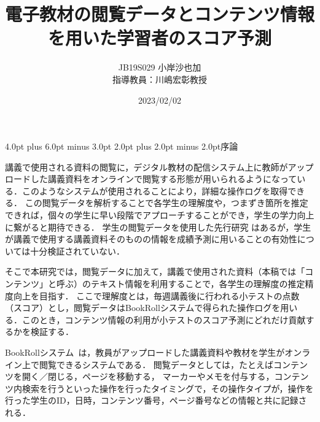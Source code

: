 \documentclass[a4paper,twocolumn,11pt]{jarticle}
\title{電子教材の閲覧データとコンテンツ情報を用いた学習者のスコア予測}
\author{JB19S029 小岸沙也加　
\\ 指導教員：川嶋宏彰教授}
\date{2023/02/02}
\makeatletter
\renewcommand{\section}{\@startsection {section}{1}{\z@}%
{4.0pt plus 6.0pt minus 3.0pt}%
{2.0pt plus 2.0pt minus 2.0pt}{\large\bf }}
\makeatother
\begin{document}
\maketitle
\newtheorem{thm}{定理}
\newtheorem{df}[thm]{定義}
\newtheorem{lm}[thm]{補題}
\newtheorem{co}[thm]{系}
\newtheorem{pr}[thm]{命題}
\newtheorem{que}[thm]{問題}

\thispagestyle{empty}

\section{序論}


講義で使用される資料の閲覧に，デジタル教材の配信システム上に教師がアップロードした講義資料をオンラインで閲覧する形態が用いられるようになっている．このようなシステムが使用されることにより，詳細な操作ログを取得できる．
この閲覧データを解析することで各学生の理解度や，つまずき箇所を推定できれば，個々の学生に早い段階でアプローチすることができ，学生の学力向上に繋がると期待できる．
学生の閲覧データを使用した先行研究
はあるが，学生が講義で使用する講義資料そのものの情報を成績予測に用いることの有効性については十分検証されていない．

そこで本研究では，閲覧データに加えて，講義で使用された資料（本稿では「コンテンツ」と呼ぶ）のテキスト情報を利用することで，各学生の理解度の推定精度向上を目指す．
ここで理解度とは，毎週講義後に行われる小テストの点数（スコア）とし，閲覧データはBookRollシステムで得られた操作ログを用いる．このとき，コンテンツ情報の利用が小テストのスコア予測にどれだけ貢献するかを検証する．

\quad 
BookRollシステム~\cite{BookRoll}は，教員がアップロードした講義資料や教材を学生がオンライン上で閲覧できるシステムである．
閲覧データとしては，たとえばコンテンツを開く／閉じる，ページを移動する，
マーカーやメモを付与する，コンテンツ内検索を行うといった操作を行ったタイミングで，その操作タイプが，操作を行った学生のID，日時，コンテンツ番号，ページ番号などの情報と共に記録される．
\end{document}
